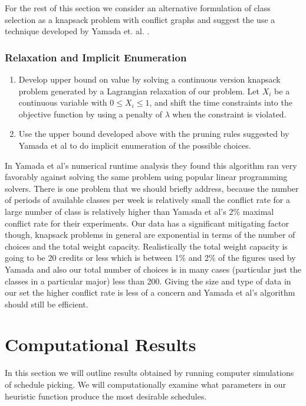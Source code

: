 \documentclass[11pt]{article} %
\begin{document}
For the rest of this section we consider an alternative formulation of class
selection as a knapsack problem with conflict graphs and suggest the use
a technique developed by Yamada et. al.  \cite{yamada:heuristic}.

\subsubsection{Relaxation and Implicit Enumeration} \begin{enumerate} \item
Develop upper bound on value by solving a continuous version knapsack problem
generated by a Lagrangian relaxation of our problem. Let $X_i$ be a continuous
variable with $0 \leq X_i \leq 1$, and shift the time constraints into the
objective function by using a penalty of $\lambda$ when the constraint is
violated.  \item Use the upper bound developed above with the pruning rules
suggested by Yamada et al \cite{yamada:heuristic} to do implicit enumeration of
the possible choices.  \end{enumerate}

In Yamada et al’s \cite{yamada:heuristic} numerical runtime analysis they found
this algorithm ran very favorably against solving the same problem using popular
linear programming solvers. There is one problem that we should briefly address,
because the number of periods of available classes per week is relatively small
the conflict rate for a large number of class is relatively higher than Yamada
et al’s 2\% maximal conflict rate for their experiments. Our data has
a significant mitigating factor though, knapsack problems in general are
exponential in terms of the number of choices and the total weight capacity.
Realistically the total weight capacity is going to be 20 credits or less which
is between 1\% and 2\% of the figures used by Yamada \cite{yamada:heuristic} and
also our total number of choices is in many cases (particular just the classes
in a particular major) less than 200. Giving the size and type of data in our
set the higher conflict rate is less of a concern and Yamada et al’s algorithm
should still be efficient.

\section{Computational Results} In this section we will outline results obtained
by running computer simulations of schedule picking. We will computationally
examine what parameters in our heuristic function produce the most desirable
schedules.

{}  
\end{document}
